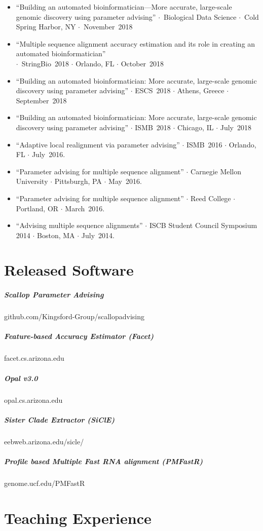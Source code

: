 \documentclass[10pt,letterpaper]{article}
\newcommand{\bigdot}{$\cdot$\xspace}
\begin{document}
\begin{itemize}[leftmargin=*,labelindent=5pt,itemindent=-15pt]
  \item ``Building an automated bioinformatician---More accurate, large-scale genomic discovery using parameter advising'' \bigdot~Biological Data Science \bigdot~Cold Spring Harbor, NY \bigdot~November~2018
   \item ``Multiple sequence alignment accuracy estimation and its role in creating an automated bioinformatician'' \\
   \bigdot~StringBio~2018 \bigdot Orlando, FL \bigdot October~2018
   \item ``Building an automated bioinformatician: More accurate, large-scale genomic discovery using parameter advising'' \bigdot ESCS~2018 \bigdot Athens, Greece \bigdot September~2018
    \item ``Building an automated bioinformatician: More accurate, large-scale genomic discovery using parameter advising'' \bigdot ISMB~2018 \bigdot Chicago, IL \bigdot July~2018
    \item ``Adaptive local realignment via parameter advising'' \bigdot ISMB~2016 \bigdot Orlando, FL \bigdot July~2016.
    \item ``Parameter advising for multiple sequence alignment''  \bigdot Carnegie Mellon University \bigdot Pittsburgh, PA \bigdot May~2016. 
    \item ``Parameter advising for multiple sequence alignment''  \bigdot Reed College \bigdot Portland, OR \bigdot March~2016. 
    \item ``Advising multiple sequence alignments'' \bigdot ISCB Student Council Symposium 2014 \bigdot  Boston, MA \bigdot July~2014.
   
\end{itemize}


\section*{Released Software}
\subparagraph{Scallop Parameter Advising}						github.com/Kingsford-Group/scallopadvising
\subparagraph{Feature-based Accuracy Estimator (Facet)} 			facet.cs.arizona.edu
\subparagraph{Opal v3.0}										opal.cs.arizona.edu 
\subparagraph{Sister Clade Extractor (SiClE)}						eebweb.arizona.edu/sicle/
\subparagraph{Profile based Multiple Fast RNA alignment (PMFastR)}	genome.ucf.edu/PMFastR 

\section*{Teaching Experience}
\end{document}

